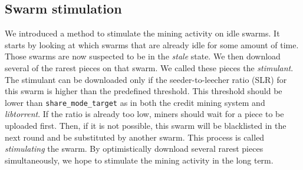 \subsection{Swarm stimulation}
\label{section:swarmstimulate}

We introduced a method to stimulate the mining activity on idle swarms. It starts by looking at which swarms that are already idle for some amount of time. Those swarms are now suspected to be in the \textit{stale} state. We then download several of the rarest pieces on that swarm. We called these pieces the \textit{stimulant}. The stimulant can be downloaded only if the seeder-to-leecher ratio (SLR) for this swarm is higher than the predefined threshold. This threshold should be lower than \texttt{share\_mode\_target} as in both the credit mining system and \textit{libtorrent}. If the ratio is already too low, miners should wait for a piece to be uploaded first. Then, if it is not possible, this swarm will be blacklisted in the next round and be substituted by another swarm. This process is called \textit{stimulating} the swarm. By optimistically download several rarest pieces simultaneously, we hope to stimulate the mining activity in the long term.